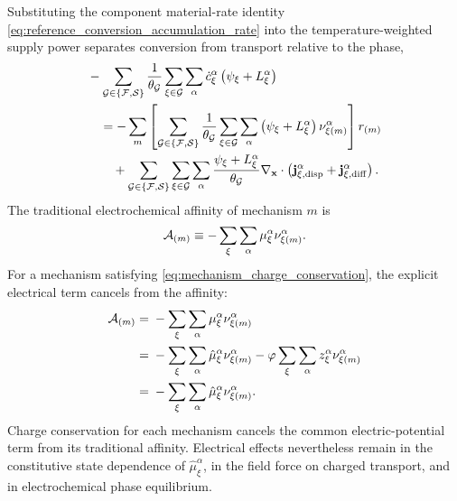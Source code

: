 Substituting the component material-rate identity
\eqref{eq:reference_conversion_accumulation_rate} into the
temperature-weighted supply power separates conversion from transport relative
to the phase,
%
\begin{align}
	 & -
	\sum_{\mathcal{G}\in\{\mathcal{F},\mathcal{S}\}}
	\frac{1}{\theta_{\mathcal{G}}}
	\sum_{\xi\in\mathcal{G}}\sum_\alpha
	\dot{c}_\xi^\alpha
	\left(
	\psi_\xi+L_\xi^\alpha
	\right)
	\notag     \\
	 & \quad =
	-\sum_m
	\left[
		\sum_{\mathcal{G}\in\{\mathcal{F},\mathcal{S}\}}
		\frac{1}{\theta_{\mathcal{G}}}
		\sum_{\xi\in\mathcal{G}}\sum_\alpha
		\left(
		\psi_\xi+L_\xi^\alpha
		\right)
		\nu_{\xi (m)}^\alpha
				\right]r_{(m)}
	\notag \\
	 & \qquad +
	\sum_{\mathcal{G}\in\{\mathcal{F},\mathcal{S}\}}
	\sum_{\xi\in\mathcal{G}}\sum_\alpha
		\frac{
		\psi_\xi+L_\xi^\alpha
		}{\theta_{\mathcal{G}}}
	\nabla_{\mathbf{x}}\cdot
	\left(
	\mathbf{j}_{\xi,{\rm disp}}^\alpha
	+
	\mathbf{j}_{\xi,{\rm diff}}^\alpha
	\right).
	\label{eq:MC_helmholtz_source_projection}
\end{align}
%
The traditional electrochemical affinity of mechanism \(m\) is
%
\begin{equation}
	\mathcal{A}_{(m)}
	\equiv
	-
	\sum_\xi\sum_\alpha
	\mu_\xi^\alpha
	\nu_{\xi (m)}^\alpha .
	\label{eq:MC_affinity_projection}
\end{equation}
%
For a mechanism satisfying \eqref{eq:mechanism_charge_conservation},
the explicit electrical term cancels from the affinity:
%
\begin{align}
	\mathcal{A}_{(m)}
	={} &
	-\sum_\xi\sum_\alpha
	\mu_\xi^\alpha
	\nu_{\xi (m)}^\alpha
	\notag \\
	={} &
	-\sum_\xi\sum_\alpha
	\hat\mu_\xi^\alpha
	\nu_{\xi (m)}^\alpha
	-
	\varphi
	\sum_\xi\sum_\alpha
	z_\xi^\alpha\nu_{\xi (m)}^\alpha
	\notag \\
	={} &
	-\sum_\xi\sum_\alpha
	\hat\mu_\xi^\alpha
	\nu_{\xi (m)}^\alpha .
	\label{eq:electrochemical_affinity_charge_cancellation}
\end{align}
%
Charge conservation for each mechanism cancels the common electric-potential
term from its traditional affinity.  Electrical effects nevertheless remain in
the constitutive state dependence of \(\hat\mu_\xi^\alpha\), in the field force
on charged transport, and in electrochemical phase equilibrium.

